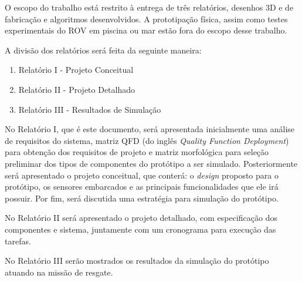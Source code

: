O escopo do trabalho está restrito à entrega de três relatórios, desenhos 3D e de fabricação e algoritmos desenvolvidos. A prototipação física, assim como testes experimentais do ROV em piscina ou mar estão fora do escopo desse trabalho.

A divisão dos relatórios será feita da seguinte maneira:
\vspace{1.5mm}

\begin{enumerate}
	\item Relatório I - Projeto Conceitual
	\item Relatório II - Projeto Detalhado
	\item Relatório III - Resultados de Simulação
\end{enumerate}
\vspace{1.5mm}
 
No Relatório I, que é este documento, será apresentada inicialmente uma análise de requisitos do sistema, matriz QFD (do inglês \textit{Quality Function Deployment}) para obtenção dos requisitos de projeto e matriz morfológica para seleção preliminar dos tipos de componentes do protótipo a ser simulado. Posteriormente será apresentado o projeto conceitual, que conterá: o \textit{design} proposto para o protótipo, os sensores embarcados e as principais funcionalidades que ele irá possuir. Por fim, será discutida uma estratégia para simulação do protótipo.

No Relatório II será apresentado o projeto detalhado, com especificação dos componentes e sistema, juntamente com um cronograma para execução das tarefas.

No Relatório III serão mostrados os resultados da simulação do protótipo atuando na missão de resgate.
